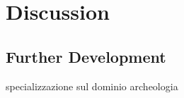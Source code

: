 \chapter{Discussion}
\label{chap:discussion}
\begin{spacing}{1.5}

\section{Further Development}

specializzazione sul dominio archeologia

\end{spacing}